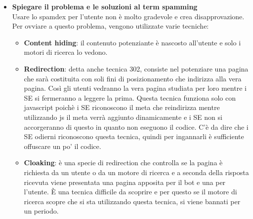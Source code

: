 \documentclass[10pt,                    %
               a4paper,                 %
               twoside,                 %
               openright,               %
               english,                 
               italian,                 
]{article}
\begin{document}
\begin{itemize}
\item \textbf{Spiegare il problema e le soluzioni al term spamming} \\
Usare lo spamdex per l'utente non è molto gradevole e crea disapprovazione.
Per ovviare a questo problema, vengono utilizzate varie tecniche:
\begin{itemize}
\item \textbf{Content hiding}: il contenuto potenziante è nascosto all'utente 
e solo i motori di ricerca lo vedono.
\item \textbf{Redirection}: detta anche tecnica 302, consiste nel potenziare 
una pagina che sarà costituita con soli fini di posizionamento che indirizza
alla vera pagina. Così gli utenti vedranno la vera pagina studiata per loro 
mentre i SE si fermeranno a leggere la prima. Questa tecnica funziona solo 
con javascript poichè i SE riconoscono il meta che reindirizza mentre 
utilizzando js il meta verrà aggiunto dinamicamente e i SE non si 
accorgeranno di questo in quanto non eseguono il codice. C'è da dire che i SE 
odierni riconoscono questa tecnica, quindi per ingannarli è sufficiente 
offuscare un po' il codice.
\item \textbf{Cloaking}: è una specie di redirection che controlla se la 
pagina è richiesta da un utente o da un motore di ricerca e a seconda della
risposta ricevuta viene presentata una pagina apposita per il bot e una per 
l'utente. È una tecnica difficile da scoprire e per questo se il motore di 
ricerca scopre che si sta utilizzando questa tecnica, si viene bannati per 
un periodo.
\end{itemize}


\end{itemize}
\end{document}
